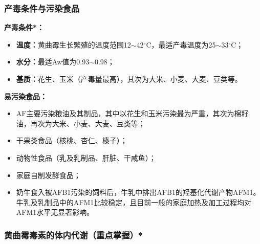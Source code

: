 \subsubsection{产毒条件与污染食品}

\begin{keybox}
\textbf{产毒条件*：}
\begin{itemize}[leftmargin=*]
    \item \textbf{温度：}黄曲霉生长繁殖的温度范围12$\sim$42$^\circ$C，最适产毒温度为25$\sim$33$^\circ$C；
    \item \textbf{水分：}最适Aw值为0.93$\sim$0.98；
    \item \textbf{基质：}花生、玉米（产毒量最高），其次为大米、小麦、大麦、豆类等。
\end{itemize}

\textbf{易污染食品：}
\begin{itemize}[leftmargin=*]
    \item AF主要污染粮油及其制品，其中以花生和玉米污染最为严重，其次为棉籽油，再次为大米、小麦、大麦、豆类等；
    \item 干果类食品（核桃、杏仁、榛子）；
    \item 动物性食品（乳及乳制品、肝脏、干咸鱼）；
    \item 家庭自制发酵食品；
    \item 奶牛食入被AFB1污染的饲料后，牛乳中排出AFB1的羟基化代谢产物AFM1。牛乳及乳制品中的AFM1比较稳定，且目前一般的家庭加热及加工过程均对AFM1水平无显著影响。
\end{itemize}
\end{keybox}

\subsubsection{黄曲霉毒素的体内代谢（重点掌握）*}

